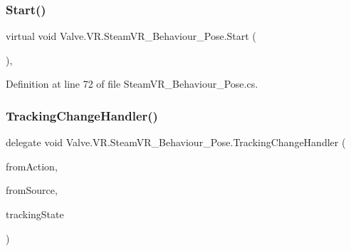 \subsubsection{\texorpdfstring{Start()}{Start()}}
{\footnotesize\ttfamily virtual void Valve.\+V\+R.\+Steam\+V\+R\+\_\+\+Behaviour\+\_\+\+Pose.\+Start (\begin{DoxyParamCaption}{ }\end{DoxyParamCaption})\hspace{0.3cm}{\ttfamily [protected]}, {\ttfamily [virtual]}}



Definition at line 72 of file Steam\+V\+R\+\_\+\+Behaviour\+\_\+\+Pose.\+cs.

\mbox{\label{class_valve_1_1_v_r_1_1_steam_v_r___behaviour___pose_a699268c8115abe175fc4cbd41cb99c11}} 
\subsubsection{\texorpdfstring{TrackingChangeHandler()}{TrackingChangeHandler()}}
{\footnotesize\ttfamily delegate void Valve.\+V\+R.\+Steam\+V\+R\+\_\+\+Behaviour\+\_\+\+Pose.\+Tracking\+Change\+Handler (\begin{DoxyParamCaption}\item[{\mbox{\hyperlink{class_valve_1_1_v_r_1_1_steam_v_r___behaviour___pose}{Steam\+V\+R\+\_\+\+Behaviour\+\_\+\+Pose}}}]{from\+Action,  }\item[{\mbox{\hyperlink{namespace_valve_1_1_v_r_a82e5bf501cc3aa155444ee3f0662853f}{Steam\+V\+R\+\_\+\+Input\+\_\+\+Sources}}}]{from\+Source,  }\item[{\mbox{\hyperlink{namespace_valve_1_1_v_r_abe6feab98f33191b7c27b4292012e90a}{E\+Tracking\+Result}}}]{tracking\+State }\end{DoxyParamCaption})}

\mbox{\label{class_valve_1_1_v_r_1_1_steam_v_r___behaviour___pose_af2fee0ef3ee6fee2917805bb050216c2}} 
